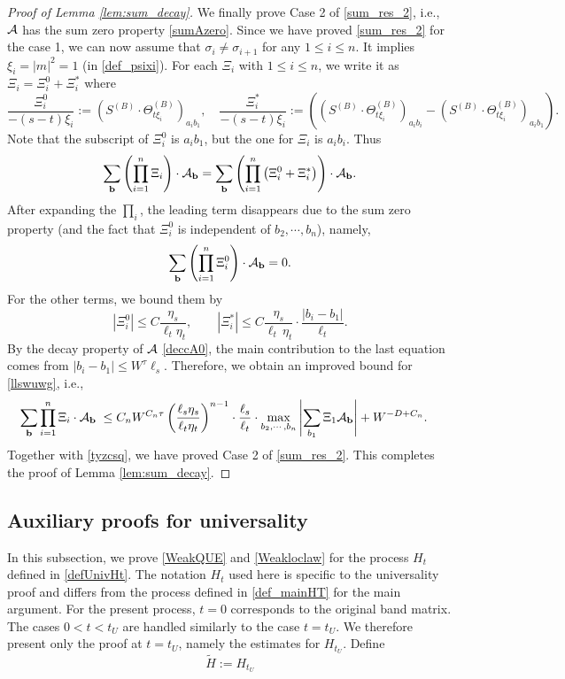 \documentclass[10pt,reqno]{article}
\theoremstyle{plain} %
\theoremstyle{remark}
\numberwithin{equation}{section}
\begin{document}
\begin{proof}[Proof of Lemma \ref{lem:sum_decay}]
We finally  prove Case 2 of \eqref{sum_res_2}, i.e., $\cal A$ has the sum zero property \eqref{sumAzero}. 
Since we have proved \eqref{sum_res_2} for the case 1,  we can now assume  that $\sigma_i\ne \sigma_{i+1}$ for any $1\le i\le n$. It implies $\xi_i=|m|^2=1$ (in \eqref{def_psixi}).    For each $\Xi_i$ with $1\le i\le n$, we write it as
$\Xi_i=\Xi^0_i+\Xi^*_i$ where
$$
\frac{\Xi^0_i}{-(s-t)\xi_i }:= \left(S^{(B)}\cdot \Theta^{(B)}_{t \xi_i}\right)_{a_ib_1},\quad
\frac{\Xi^*_i}{-(s-t)\xi_i }:= \left(\left(S^{(B)}\cdot \Theta^{(B)}_{t \xi_i}\right)_{a_ib_i}-\left(S^{(B)}\cdot \Theta^{(B)}_{t \xi_i}\right)_{a_ib_1}\right).
$$
Note that the subscript of $\Xi^0_i$ is $a_ib_1$, but the one for $\Xi_i$ is $a_ib_i$.  Thus 
$$\sum_{\textbf{b}}   \left(\prod_{i=1}^n  \Xi_i\right)  \cdot 
{\cal A}_{\textbf{b}}=\sum_{\textbf{b}} 
\left(\prod_{i=1}^n  \left(\Xi^0_i+  \Xi^*_i \right)\right)\cdot 
{\cal A}_{\textbf{b}}.
$$
After expanding the $\prod_i$, the leading term disappears due to the sum zero property (and the fact that $\Xi_i^0$ is independent of  $b_2,\cdots, b_n$), namely,  
$$
\sum_{\textbf{b}}
\left(\prod_{i=1}^n \Xi^0_i\right)\cdot {\cal A}_{\textbf{b}}=0.
$$
For the other terms, we bound them by 
$$
\left|\Xi_i^0\right|\le C\frac{\eta_s}{\ell_t\eta_t}, \quad \quad   \left|\Xi_i^*\right|\le C\frac{\eta_s}{\ell _t\,\eta_t}\cdot \frac{|b_i-b_1|}{\ell_t}.
$$
By the decay  property of $\cal A$  \eqref{deccA0},  the main contribution to the last equation comes from $|b_i-b_1|\le W^\tau \ell_s$. Therefore, we obtain an improved bound for  \eqref{llswuwg}, i.e., 
\begin{align}\label{llswuwg2}
  \sum_{\textbf{b}}   \prod_{i=1}^n  \Xi_i  \cdot 
{\cal A}_{\textbf{b}}
\;\le\; & C_n W^{C_n\tau} \left(\frac{\ell_s \eta_s}{\ell_t \eta_t} \right)^{n-1} \cdot \frac{\ell_s}{\ell_t}\cdot  \max_{b_2,\cdots, b_n}  \left|\sum_{b_1 }\Xi_1 {\cal A}_{\textbf{b}}\right|+W^{-D+C_n}. 
\end{align}
Together with \eqref{tyzcsq}, we have proved Case 2 of   \eqref{sum_res_2}. This completes the proof of Lemma \ref{lem:sum_decay}. 
 
\end{proof}

\subsection{Auxiliary proofs for universality}\label{Apu}

In this subsection, we prove \eqref{WeakQUE} and \eqref{Weakloclaw} for the process $H_t$ defined in \eqref{defUnivHt}. The notation $H_t$ used here is specific to the universality proof and differs from the process defined in \eqref{def_mainHT} for the main argument.
For the present process, $t=0$ corresponds to the original band matrix. The cases $0<t<t_U$ are handled similarly to the case $t=t_U$. We therefore present only the proof at $t=t_U$, namely the estimates for $H_{t_U}$. Define
\begin{equation}\label{defwtHHtu}
     \widetilde{H} := H_{t_U}
\end{equation}
 
\end{document}
